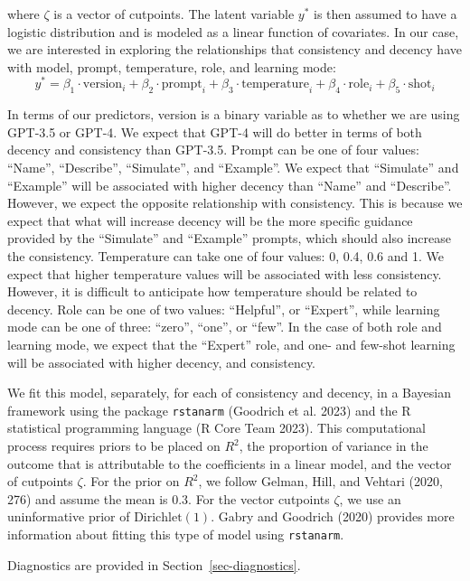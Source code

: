 \documentclass[
  letterpaper,
  DIV=11,
  numbers=noendperiod]{scrartcl}
\begin{document}
where \(\zeta\) is a vector of cutpoints. The latent variable \(y^*\) is
then assumed to have a logistic distribution and is modeled as a linear
function of covariates. In our case, we are interested in exploring the
relationships that consistency and decency have with model, prompt,
temperature, role, and learning mode: \[
y^* = \beta_1 \cdot \mbox{version}_i + \beta_2 \cdot \mbox{prompt}_i + \beta_3 \cdot \mbox{temperature}_i + \beta_4 \cdot \mbox{role}_i + \beta_5 \cdot \mbox{shot}_i
\]

In terms of our predictors, version is a binary variable as to whether
we are using GPT-3.5 or GPT-4. We expect that GPT-4 will do better in
terms of both decency and consistency than GPT-3.5. Prompt can be one of
four values: ``Name'', ``Describe'', ``Simulate'', and ``Example''. We
expect that ``Simulate'' and ``Example'' will be associated with higher
decency than ``Name'' and ``Describe''. However, we expect the opposite
relationship with consistency. This is because we expect that what will
increase decency will be the more specific guidance provided by the
``Simulate'' and ``Example'' prompts, which should also increase the
consistency. Temperature can take one of four values: 0, 0.4, 0.6 and 1.
We expect that higher temperature values will be associated with less
consistency. However, it is difficult to anticipate how temperature
should be related to decency. Role can be one of two values:
``Helpful'', or ``Expert'', while learning mode can be one of three:
``zero'', ``one'', or ``few''. In the case of both role and learning
mode, we expect that the ``Expert'' role, and one- and few-shot learning
will be associated with higher decency, and consistency.

We fit this model, separately, for each of consistency and decency, in a
Bayesian framework using the package \texttt{rstanarm} (Goodrich et al.
2023) and the R statistical programming language (R Core Team 2023).
This computational process requires priors to be placed on \(R^2\), the
proportion of variance in the outcome that is attributable to the
coefficients in a linear model, and the vector of cutpoints \(\zeta\).
For the prior on \(R^2\), we follow Gelman, Hill, and Vehtari (2020,
276) and assume the mean is 0.3. For the vector cutpoints \(\zeta\), we
use an uninformative prior of \(\text{Dirichlet}(1)\). Gabry and
Goodrich (2020) provides more information about fitting this type of
model using \texttt{rstanarm}.

Diagnostics are provided in Section~\ref{sec-diagnostics}.
\end{document}
